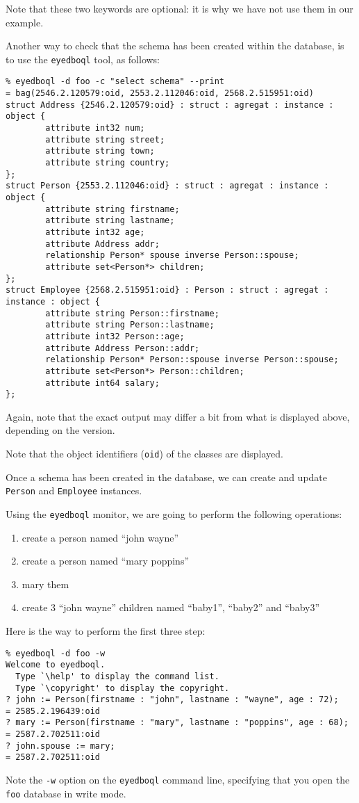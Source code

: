 Note that these two keywords are optional: it is why we have not use
them in our example.

Another way to check that the schema has been created within the database,
is to use the \texttt{eyedboql} tool, as follows:
\verbsize \begin{verbatim}
% eyedboql -d foo -c "select schema" --print
= bag(2546.2.120579:oid, 2553.2.112046:oid, 2568.2.515951:oid)
struct Address {2546.2.120579:oid} : struct : agregat : instance : object { 
        attribute int32 num;
        attribute string street;
        attribute string town;
        attribute string country;
};
struct Person {2553.2.112046:oid} : struct : agregat : instance : object { 
        attribute string firstname;
        attribute string lastname;
        attribute int32 age;
        attribute Address addr;
        relationship Person* spouse inverse Person::spouse;
        attribute set<Person*> children;
};
struct Employee {2568.2.515951:oid} : Person : struct : agregat : instance : object { 
        attribute string Person::firstname;
        attribute string Person::lastname;
        attribute int32 Person::age;
        attribute Address Person::addr;
        relationship Person* Person::spouse inverse Person::spouse;
        attribute set<Person*> Person::children;
        attribute int64 salary;
};
\end{verbatim}
\normalsize

Again, note that the exact output may differ a bit from what is displayed above, depending on the \eyedb version.

Note that the object identifiers (\texttt{oid}) of the classes are displayed.



Once a schema has been created in the database, we can create and update
\texttt{Person} and \texttt{Employee} instances.

Using the \texttt{eyedboql} monitor, we are going to perform the following
operations:
\begin{enumerate}
\item create a person named ``john wayne''
\item create a person named ``mary poppins''
\item mary them
\item create 3 ``john wayne'' children named ``baby1'', ``baby2'' and ``baby3''
\end{enumerate}

Here is the way to perform the first three step:
\verbsize \begin{verbatim}
% eyedboql -d foo -w
Welcome to eyedboql.
  Type `\help' to display the command list.
  Type `\copyright' to display the copyright.
? john := Person(firstname : "john", lastname : "wayne", age : 72);
= 2585.2.196439:oid
? mary := Person(firstname : "mary", lastname : "poppins", age : 68);
= 2587.2.702511:oid
? john.spouse := mary;
= 2587.2.702511:oid
\end{verbatim}
\normalsize
Note the \texttt{-w} option on the \texttt{eyedboql} command line, specifying that you open the \texttt{foo} database in write mode.

